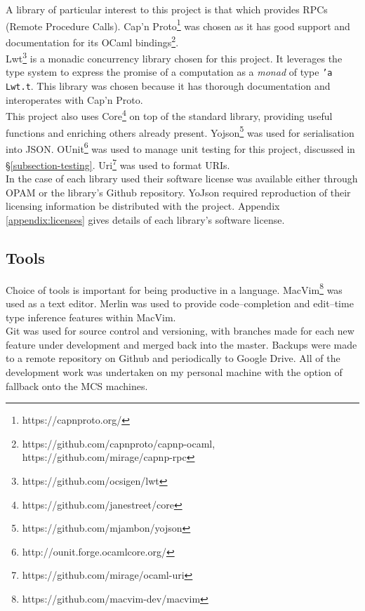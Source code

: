 A library of particular interest to this project is that which provides RPCs (Remote Procedure Calls). Cap'n Proto\footnote{https://capnproto.org/} was chosen as it has good support and documentation for its OCaml bindings\footnote{https://github.com/capnproto/capnp-ocaml, https://github.com/mirage/capnp-rpc}. \\

Lwt\footnote{https://github.com/ocsigen/lwt} is a monadic concurrency library chosen for this project. It leverages the type system to express the promise of a computation as a \emph{monad} of type \texttt{'a Lwt.t}. This library was chosen because it has thorough documentation and interoperates with Cap'n Proto. \\

This project also uses Core\footnote{https://github.com/janestreet/core} on top of the standard library, providing useful functions and enriching others already present. Yojson\footnote{https://github.com/mjambon/yojson} was used for serialisation into JSON. OUnit\footnote{http://ounit.forge.ocamlcore.org/} was used to manage unit testing for this project, discussed in \S\ref{subsection-testing}. Uri\footnote{https://github.com/mirage/ocaml-uri} was used to format URIs. \\

In the case of each library used their software license was available either through OPAM or the library's Github repository. {\color{red}YoJson required reproduction of their licensing information be distributed with the project}. Appendix \ref{appendix:licenses} gives details of each library's software license.

\subsection{Tools}
  
Choice of tools is important for being productive in a language. MacVim\footnote{https://github.com/macvim-dev/macvim} was used as a text editor. Merlin was used to provide code--completion and edit--time type inference features within MacVim. \\ 

Git was used for source control and versioning, with branches made for each new feature under development and merged back into the master. Backups were made to a remote repository on Github and periodically to Google Drive. All of the development work was undertaken on my personal machine with the option of fallback onto the MCS machines. \\

